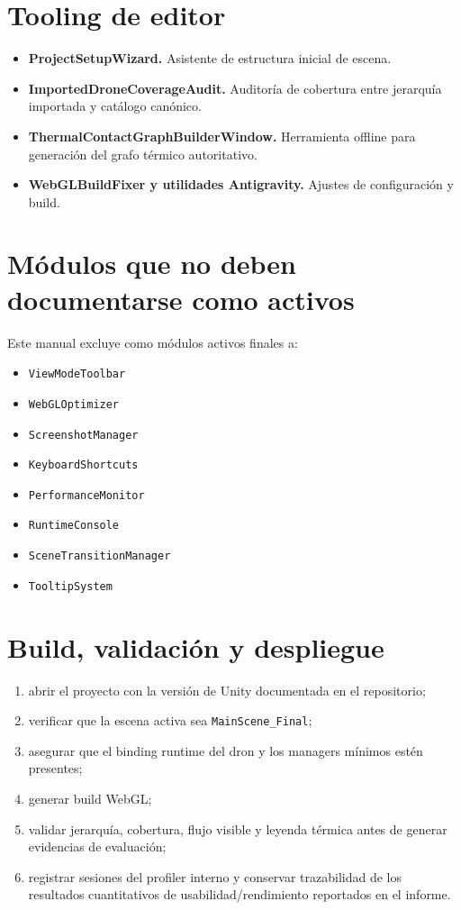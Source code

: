 \documentclass[12pt,letterpaper]{article}
\begin{document}
\section{Tooling de editor}
\begin{itemize}
    \item \textbf{ProjectSetupWizard.} Asistente de estructura inicial de escena.
    \item \textbf{ImportedDroneCoverageAudit.} Auditoría de cobertura entre jerarquía importada y catálogo canónico.
    \item \textbf{ThermalContactGraphBuilderWindow.} Herramienta offline para generación del grafo térmico autoritativo.
    \item \textbf{WebGLBuildFixer y utilidades Antigravity.} Ajustes de configuración y build.
\end{itemize}

\section{Módulos que no deben documentarse como activos}
Este manual excluye como módulos activos finales a:
\begin{itemize}
    \item \texttt{ViewModeToolbar}
    \item \texttt{WebGLOptimizer}
    \item \texttt{ScreenshotManager}
    \item \texttt{KeyboardShortcuts}
    \item \texttt{PerformanceMonitor}
    \item \texttt{RuntimeConsole}
    \item \texttt{SceneTransitionManager}
    \item \texttt{TooltipSystem}
\end{itemize}

\section{Build, validación y despliegue}
\begin{enumerate}
    \item abrir el proyecto con la versión de Unity documentada en el repositorio;
    \item verificar que la escena activa sea \texttt{MainScene\_Final};
    \item asegurar que el binding runtime del dron y los managers mínimos estén presentes;
    \item generar build WebGL;
    \item validar jerarquía, cobertura, flujo visible y leyenda térmica antes de generar evidencias de evaluación;
    \item registrar sesiones del profiler interno y conservar trazabilidad de los resultados cuantitativos de usabilidad/rendimiento reportados en el informe.
\end{enumerate}
\end{document}
